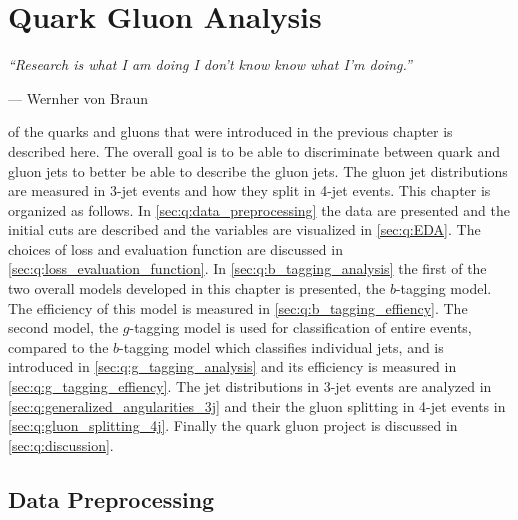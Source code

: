 
\chapter{Quark Gluon Analysis}
\label{ch:quark_gluon_analysis}
\epigraph{\textit{``Research is what I am doing I don't know know what I'm doing.''}}{---  Wernher von Braun}


 of the quarks and gluons that were introduced in the previous chapter is described here. The overall goal is to be able to discriminate between quark and gluon jets to better be able to describe the gluon jets. The gluon jet distributions are measured in 3-jet events and how they split in 4-jet events. This chapter is organized as follows. In \autoref{sec:q:data_preprocessing} the data are presented and the initial cuts are described and the variables are visualized in \autoref{sec:q:EDA}. The choices of loss and evaluation function are discussed in \autoref{sec:q:loss_evaluation_function}. In \autoref{sec:q:b_tagging_analysis} the first of the two overall models developed in this chapter is presented, the $b$-tagging model. The efficiency of this model is measured in \autoref{sec:q:b_tagging_effiency}. The second model, the $g$-tagging model is used for classification of entire events, compared to the $b$-tagging model which classifies individual jets, and is introduced in \autoref{sec:q:g_tagging_analysis} and its efficiency is measured in \autoref{sec:q:g_tagging_effiency}. The jet distributions in 3-jet events are analyzed in \autoref{sec:q:generalized_angularities_3j} and their the gluon splitting in 4-jet events in \autoref{sec:q:gluon_splitting_4j}. Finally the quark gluon project is discussed in \autoref{sec:q:discussion}.


\section{Data Preprocessing}
\label{sec:q:data_preprocessing}


